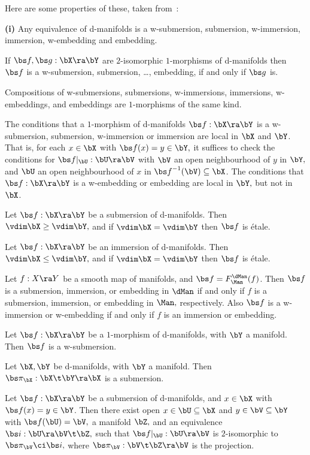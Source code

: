 \documentclass{article}
\begin{document}
Here are some properties of these, taken from~\cite[\S 4.1--\S
4.2]{Joyc6}:

\begin{thm}{\bf(i)} Any equivalence of d-manifolds is a
w-submersion, submersion, w-immersion, immersion, w-embedding and
embedding.
\smallskip

 If\/ $\bs f,\bs g:\bX\ra\bY$ are $2$-isomorphic
$1$-morphisms of d-manifolds then $\bs f$ is a w-submersion,
submersion, \ldots, embedding, if and only if\/ $\bs g$ is.
\smallskip

 Compositions of w-submersions, submersions,
w-immersions, immersions, w-embeddings, and embeddings are
$1$-morphisms of the same kind.
\smallskip

 The conditions that a $1$-morphism of
d-manifolds\/ $\bs f:\bX\ra\bY$ is a w-submersion, submersion,
w-immersion or immersion are local in $\bX$ and\/ $\bY$. That is,
for each\/ $x\in\bX$ with\/ $\bs f(x)=y\in\bY,$ it suffices to check
the conditions for $\bs f\vert_\bU:\bU\ra\bV$ with $\bV$ an open
neighbourhood of\/ $y$ in $\bY,$ and\/ $\bU$ an open neighbourhood
of\/ $x$ in\/ ${\bs f}^{-1}(\bV)\subseteq\bX$. The conditions that\/
$\bs f:\bX\ra\bY$ is a w-embedding or embedding are local in $\bY,$
but not in\/~$\bX$.
\smallskip

 Let\/ $\bs f:\bX\ra\bY$ be a submersion of
d-manifolds. Then $\vdim\bX\ge\vdim\bY,$ and if\/
$\vdim\bX=\vdim\bY$ then\/ $\bs f$ is \'etale.
\smallskip

 Let\/ $\bs f:\bX\ra\bY$ be an immersion of
d-manifolds. Then $\vdim\bX\le\vdim\bY,$ and if\/
$\vdim\bX=\vdim\bY$ then\/ $\bs f$ is \'etale.
\smallskip

 Let\/ $f:X\ra Y$ be a smooth map of manifolds,
and\/ $\bs f=F_\Man^\dMan(f)$. Then $\bs f$ is a submersion,
immersion, or embedding in $\dMan$ if and only if\/ $f$ is a
submersion, immersion, or embedding in $\Man,$ respectively. Also
$\bs f$ is a w-immersion or w-embedding if and only if\/ $f$ is an
immersion or embedding.
\smallskip

 Let\/ $\bs f:\bX\ra\bY$ be a $1$-morphism of
d-manifolds, with\/ $\bY$ a manifold. Then $\bs f$ is a
w-submersion.
\smallskip

 Let\/ $\bX,\bY$ be d-manifolds, with\/ $\bY$ a
manifold. Then $\bs\pi_\bX:\bX\t\bY\ra\bX$ is a submersion.
\smallskip

 Let\/ $\bs f:\bX\ra\bY$ be a submersion of
d-manifolds, and\/ $x\in\bX$ with\/ $\bs f(x)=y\in\bY$. Then there
exist open $x\in\bU\subseteq\bX$ and\/ $y\in\bV\subseteq\bY$ with\/
$\bs f(\bU)=\bV,$ a manifold\/ $\bZ,$ and an equivalence $\bs
i:\bU\ra\bV\t\bZ,$ such that\/ $\bs f\vert_\bU:\bU\ra\bV$ is
$2$-isomorphic to $\bs\pi_\bV\ci\bs i,$ where
$\bs\pi_\bV:\bV\t\bZ\ra\bV$ is the projection.
\smallskip


\end{thm}
\end{document}
